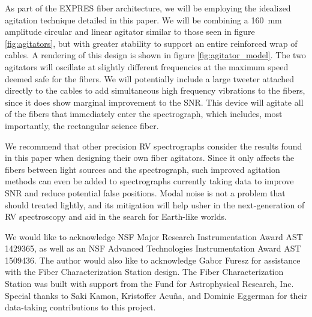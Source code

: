 \documentclass[twocolumn]{emulateapj}
\begin{document}
As part of the EXPRES fiber architecture, we will be employing the idealized agitation technique detailed in this paper. We will be combining a \SI{160}{\milli\meter} amplitude circular and linear agitator similar to those seen in figure \ref{fig:agitators}, but with greater stability to support an entire reinforced wrap of cables. A rendering of this design is shown in figure \ref{fig:agitator_model}. The two agitators will oscillate at slightly different frequencies at the maximum speed deemed safe for the fibers. We will potentially include a large tweeter attached directly to the cables to add simultaneous high frequency vibrations to the fibers, since it does show marginal improvement to the SNR. This device will agitate all of the fibers that immediately enter the spectrograph, which includes, most importantly, the rectangular science fiber.

We recommend that other precision RV spectrographs consider the results found in this paper when designing their own fiber agitators. Since it only affects the fibers between light sources and the spectrograph, such improved agitation methods can even be added to spectrographs currently taking data to improve SNR and reduce potential false positions. Modal noise is not a problem that should treated lightly, and its mitigation will help usher in the next-generation of RV spectroscopy and aid in the search for Earth-like worlds.

\acknowledgments

We would like to acknowledge NSF Major Research Instrumentation Award AST 1429365, as well as an NSF Advanced Technologies Instrumentation Award AST 1509436. The author would also like to acknowledge Gabor Furesz for assistance with the Fiber Characterization Station design. The Fiber Characterization Station was built with support from the Fund for Astrophysical Research, Inc. Special thanks to Saki Kamon, Kristoffer Acu\~na, and Dominic Eggerman for their data-taking contributions to this project.

\end{document}
